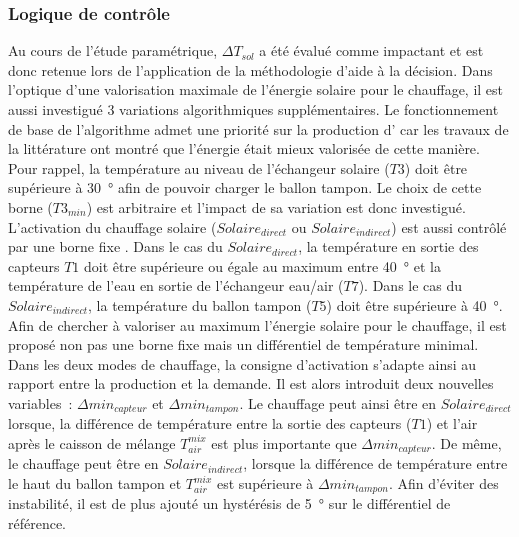 \subsubsection{Logique de contrôle} %
\label{ssub:logique_de_controle}
Au cours de l’étude paramétrique, $\Delta T_{sol}$ a été évalué comme impactant et
est donc retenue lors de l’application de la méthodologie d’aide à la décision.
Dans l’optique d’une valorisation maximale de l’énergie solaire pour le chauffage, il est aussi
investigué $3$ variations algorithmiques supplémentaires.
Le fonctionnement de base de l’algorithme admet une priorité sur la production d’
car les travaux de la littérature ont montré que l’énergie était mieux valorisée de cette
manière. Pour rappel, la température au niveau de l’échangeur solaire ($T3$) doit être
supérieure à \SI{30}{\degree} afin de pouvoir charger le ballon tampon. Le choix de cette
borne ($T3_{min}$) est arbitraire et l’impact de sa variation est donc investigué.
L’activation du chauffage solaire ($Solaire_{direct}$ ou $Solaire_{indirect}$) est aussi
contrôlé par une borne fixe . Dans le cas du
$Solaire_{direct}$, la température en sortie des capteurs $T1$ doit être supérieure ou
égale au maximum entre \SI{40}{\degree} et la température de l’eau en sortie de
l’échangeur eau/air ($T7$). Dans le cas du $Solaire_{indirect}$, la température du ballon
tampon ($T5$) doit être supérieure à \SI{40}{\degree}. Afin de chercher à valoriser au
maximum l’énergie solaire pour le chauffage, il est proposé non pas une borne fixe mais un
différentiel de température minimal. Dans les deux modes de chauffage, la consigne
d’activation s’adapte ainsi au rapport entre la production et la demande. Il est
alors introduit deux nouvelles variables~: $\Delta min_{capteur}$ et $\Delta min_{tampon}$.
Le chauffage peut ainsi être en $Solaire_{direct}$ lorsque, la différence de température entre la sortie des capteurs
($T1$) et l’air après le caisson de mélange $T_{air}^{mix}$ est plus importante que
$\Delta min_{capteur}$. De même, le chauffage peut être en $Solaire_{indirect}$, lorsque
la différence de température entre le haut du ballon tampon et $T_{air}^{mix}$ est
supérieure à $\Delta min_{tampon}$. Afin d’éviter des instabilité, il est de plus ajouté
un hystérésis de \SI{5}{\degree} sur le différentiel de référence.



